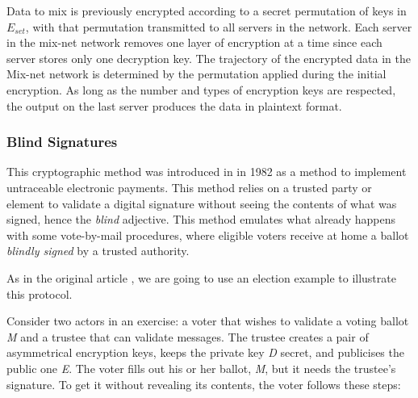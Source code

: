 \documentclass[../access.tex]{subfiles}
\begin{document}
            Data to mix is previously encrypted according to a secret permutation of keys in $ E_{set} $, with that permutation transmitted to all servers in the network. Each server in the mix-net network removes one layer of encryption at a time since each server stores only one decryption key. The trajectory of the encrypted data in the Mix-net network is determined by the permutation applied during the initial encryption. As long as the number and types of encryption keys are respected, the output on the last server produces the data in plaintext format.
        
        \subsubsection{Blind Signatures}
            \label{blind-signature}
            This cryptographic method was introduced in \cite{Chaum1982} in 1982 as a method to implement untraceable electronic payments. This method relies on a trusted party or element to validate a digital signature without seeing the contents of what was signed, hence the \textit{blind} adjective. This method emulates what already happens with some vote-by-mail procedures, where eligible voters receive at home a ballot \textit{blindly signed} by a trusted authority.
            \par
            As in the original article \cite{Chaum1982}, we are going to use an election example to illustrate this protocol.
            \par
            Consider two actors in an exercise: a voter that wishes to validate a voting ballot \textit{M} and a trustee that can validate messages. The trustee creates a pair of asymmetrical encryption keys, keeps the private key \textit{D} secret, and publicises the public one \textit{E}. The voter fills out his or her ballot, \textit{M}, but it needs the trustee's signature. To get it without revealing its contents, the voter follows these steps:
\end{document}

